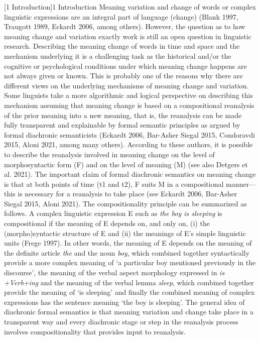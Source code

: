 \documentclass[10pt]{article}
\makeatletter
\renewcommand\section{\@startsection{section}{1}{0.0cm}{0.5in}{0.3335in}{\normalfont\normalsize\fontsize{12pt}{14.4pt}\selectfont\bfseries\raggedright}}
\newenvironment{styleStandard}{\renewcommand\baselinestretch{1.25}\setlength\leftskip{0cm}\setlength\rightskip{0cm}\setlength\parindent{0cm}\setlength\parfillskip{0pt plus 1fil}\setlength\parskip{0in plus 1pt}\writerlistparindent\writerlistleftskip\leavevmode\normalfont\normalsize\fontsize{12pt}{14.4pt}\selectfont\writerlistlabel\ignorespaces}{\unskip\vspace{0in plus 1pt}\par}
\newcommand\writerlistleftskip{}
\newcommand\writerlistparindent{}
\newcommand\writerlistlabel{}
\makeatother
\begin{document}
\clearpage\clearpage\setcounter{page}{1}\section[1 Introduction]{1 Introduction}
\begin{styleStandard}
Meaning variation and change of words or complex linguistic expressions are an integral part of language (change) (Blank 1997, Traugott 1989, Eckardt 2006, among others). However, the question as to how meaning change and variation exactly work is still an open question in linguistic research. Describing the meaning change of words in time and space and the mechanism underlying it is a challenging task as the historical and/or the cognitive or psychological conditions under which meaning change happens are not always given or known. This is probably one of the reasons why there are different views on the underlying mechanisms of meaning change and variation. Some linguists take a more algorithmic and logical perspective on describing this mechanism assuming that meaning change is based on a compositional reanalysis of the prior meaning into a new meaning, that is, the reanalysis can be made fully transparent and explainable by formal semantic principles as argued by formal diachronic semanticists (Eckardt 2006, Bar-Asher Siegal 2015, Condoravdi 2015, Aloni 2021, among many others). According to these authors, it is possible to describe the reanalysis involved in meaning change on the level of morphosyntactic form (F) and on the level of meaning (M) (see also Detgers et al. 2021). The important claim of formal diachronic semantics on meaning change is that at both points of time (t1 and t2), F suits M in a compositional manner—this is necessary for a reanalysis to take place (see Eckardt 2006, Bar-Asher Siegal 2015, Aloni 2021). The compositionality principle can be summarized as follows. A complex linguistic expression E such as \textit{the boy is sleeping} is compositional if the meaning of E depends on, and only on, (i) the (morpho)syntactic structure of E and (ii) the meanings of E’s simple linguistic units (Frege 1997). In other words, the meaning of E depends on the meaning of the definite article \textit{the} and the noun \textit{boy}, which combined together syntactically provide a more complex meaning of ‘a particular boy mentioned previously in the discourse’, the meaning of the verbal aspect morphology expressed in \textit{is +Verb+ing} and the meaning of the verbal lemma \textit{sleep}, which combined together provide the meaning of ‘is sleeping’ and finally the combined meaning of complex expressions has the sentence meaning ‘the boy is sleeping’. The general idea of diachronic formal semantics is that meaning variation and change take place in a transparent way and every diachronic stage or step in the reanalysis process involves compositionality that provides input to reanalysis.
\end{styleStandard}
\end{document}
